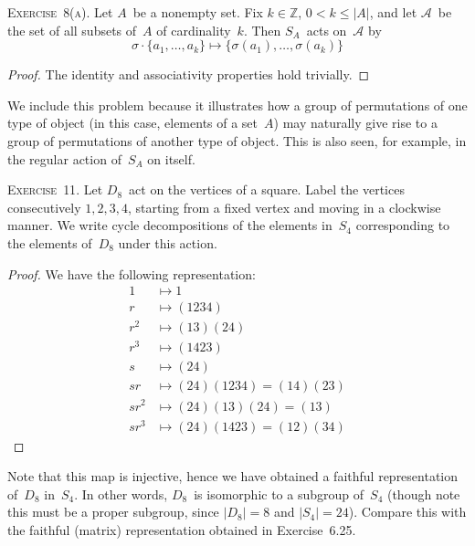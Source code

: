 \documentclass[letterpaper]{article}
\newcommand{\exercise}[1]{\goodbreak\noindent\textsc{Exercise~{#1}.}}
\newcommand{\A}{\mathcal{A}}
\newcommand{\Z}{\mathbb{Z}}
\newcommand{\ord}[1]{|{#1}|}
\begin{document}
\bigskip
\exercise{8(a)}
Let $A$~be a nonempty set. Fix $k\in\Z$, $0<k\le\ord{A}$, and let $\A$~be the set of all subsets of~$A$ of cardinality~$k$. Then $S_A$~acts on~$\A$ by
$$\sigma\cdot\{a_1,\ldots,a_k\}\mapsto\{\sigma(a_1),\ldots,\sigma(a_k)\}$$
\begin{proof}
The identity and associativity properties hold trivially.
\end{proof}
\noindent We include this problem because it illustrates how a group of permutations of one type of object (in this case, elements of a set~$A$) may naturally give rise to a group of permutations of another type of object. This is also seen, for example, in the regular action of~$S_A$ on itself.

\bigskip
\exercise{11}
Let $D_8$~act on the vertices of a square. Label the vertices consecutively $1,2,3,4$, starting from a fixed vertex and moving in a clockwise manner. We write cycle decompositions of the elements in~$S_4$ corresponding to the elements of~$D_8$ under this action.
\begin{proof}
We have the following representation:
\begin{align*}
1&\mapsto1\\
r&\mapsto(1234)\\
r^2&\mapsto(13)(24)\\
r^3&\mapsto(1423)\\
s&\mapsto(24)\\
sr&\mapsto(24)(1234)=(14)(23)\\
sr^2&\mapsto(24)(13)(24)=(13)\\
sr^3&\mapsto(24)(1423)=(12)(34)
\end{align*}
\end{proof}
\noindent Note that this map is injective, hence we have obtained a faithful representation of~$D_8$ in~$S_4$. In other words, $D_8$~is isomorphic to a subgroup of~$S_4$ (though note this must be a proper subgroup, since $\ord{D_8}=8$ and $\ord{S_4}=24$). Compare this with the faithful (matrix) representation obtained in Exercise~6.25.
\end{document}

